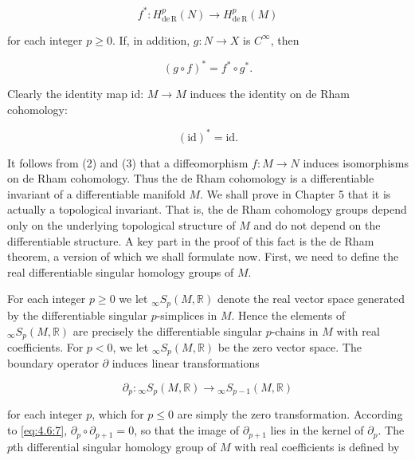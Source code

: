 \begin{equation}
\tag{1}\label{eq:4.15:1}
f^{*}\colon H_{\mathrm{de\,R}}^{p}(N)\to H_{\mathrm{de\,R}}^{p}(M)
\end{equation}

for each integer  $ p \geq 0 $. If, in addition,  $ g: N \to X $ is  $ C^\infty $, then

\begin{equation}
\tag{2}\label{eq:4.15:2}
(g\circ f)^{*}=f^{*}\circ g^{*}.
\end{equation}

Clearly the identity map id: $M \to M$ induces the identity on de Rham cohomology:

\begin{equation}
\tag{3}\label{eq:4.15:3}
(\mathrm{id})^{*}=\mathrm{id}.
\end{equation}

It follows from (2) and (3) that a diffeomorphism $f\colon M\to N$ induces isomorphisms on de Rham cohomology. Thus the de Rham cohomology is a differentiable invariant of a differentiable manifold $M$. We shall prove in Chapter 5 that it is actually a topological invariant. That is, the de Rham cohomology groups depend only on the underlying topological structure of $M$ and do not depend on the differentiable structure. A key part in the proof of this fact is the de Rham theorem, a version of which we shall formulate now. First, we need to define the real differentiable singular homology groups of $M$. 

\label{thm:4.16}
For each integer $p \geq 0$ we let ${}_{\infty}S_p(M,\mathbb{R})$ denote the real vector space generated by the differentiable singular $p$-simplices in $M$. Hence the elements of ${}_{\infty}S_p(M,\mathbb{R})$ are precisely the differentiable singular $p$-chains in $M$ with real coefficients. For $p < 0$, we let ${}_{\infty}S_p(M,\mathbb{R})$ be the zero vector space. The boundary operator $\partial$ induces linear transformations

\begin{equation}
\tag{1}\label{eq:4.16:1}
\partial_{p}\colon{}_{\infty}S_{p}(M,\mathbb{R})\to{}_{\infty}S_{p-1}(M,\mathbb{R})
\end{equation}

for each integer $p$, which for $p \leq 0$ are simply the zero transformation. According to \eqref{eq:4.6:7}, $\partial_{p} \circ \partial_{p+1} = 0$, so that the image of $\partial_{p+1}$ lies in the kernel of $\partial_{p}$. The $p$th differential singular homology group of $M$ with real coefficients is defined by

